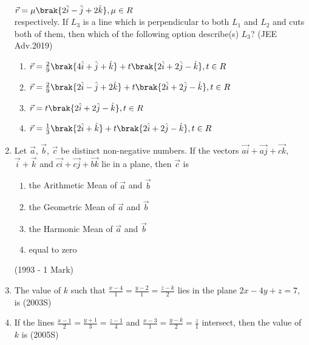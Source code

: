 \begin{enumerate}
		$\vec{r}=\mu \brak{2\hat{i}-\hat{j}+2\hat{k}}, \mu \in R$\\ respectively. If $L_3$ is a line which is perpendicular to both $L_1$ and $L_2$ and cuts both of them, then which of 
		the following option describe(s) $L_3$? \hfill{(JEE Adv.2019)}
		\begin{enumerate}
			\item $\vec{r}=\frac{2}{9}\brak{4\hat{i}+\hat{j}+\hat{k}}+t\brak{2\hat{i}+2\hat{j}-\hat{k}},t \in R$
			\item $\vec{r}=\frac{2}{9}\brak{2\hat{i}-\hat{j}+2\hat{k}}+t\brak{2\hat{i}+2\hat{j}-\hat{k}}, t \in R$
			\item $\vec{r}=t\brak{2\hat{i}+2\hat{j}-\hat{k}},t \in R$
			\item $\vec{r}=\frac{1}{3}\brak{2\hat{i}+\hat{k}}+t\brak{2\hat{i}+2\hat{j}-\hat{k}},t \in R$
		\end{enumerate}
\item Let $\vec{a}$, $\vec{b}$, $\vec{c}$ be distinct non-negative numbers. If the vectors $\vec{ai} + \vec{aj} + \vec{ck}$, $\vec{i}+\vec{k}$ and $\vec{ci}+\vec{cj}+\vec{bk}$ lie in a plane, then $\vec{c}$ is
\begin{enumerate}
\item the Arithmetic Mean of $\vec{a}$ and $\vec{b}$
\item the Geometric Mean of $\vec{a}$ and $\vec{b}$
\item the Harmonic Mean of $\vec{a}$ and $\vec{b}$
\item equal to zero
\end{enumerate}
\hfill (1993 - 1 Mark)
\item The value of $k$ such that $\frac{x-4}{1}=\frac{y-2}{1}=\frac{z-k}{2}$ lies in the plane $2x-4y+z=7$, is
\hfill (2003S)
\begin{enumerate}
\end{enumerate}
\item If the lines $\frac{x-1}{2}=\frac{y+1}{3}=\frac{z-1}{4}$ and $\frac{x-3}{1}=\frac{y-k}{2}=\frac{z}{1}$ intersect, then the value of $k$ is 
\hfill (2005S)
\begin{enumerate}
\end{enumerate}
\end{enumerate}
